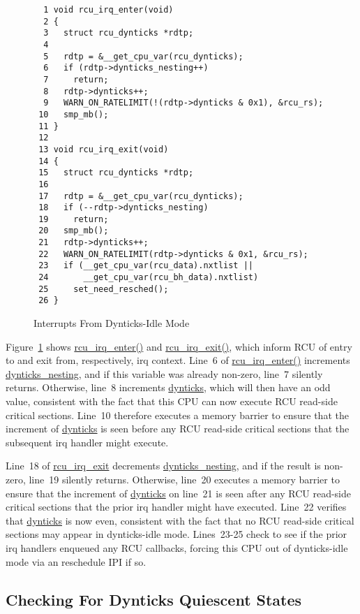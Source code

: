 \begin{figure}[tbp]
{ \scriptsize
\begin{verbatim}
  1 void rcu_irq_enter(void)
  2 {
  3   struct rcu_dynticks *rdtp;
  4 
  5   rdtp = &__get_cpu_var(rcu_dynticks);
  6   if (rdtp->dynticks_nesting++)
  7     return;
  8   rdtp->dynticks++;
  9   WARN_ON_RATELIMIT(!(rdtp->dynticks & 0x1), &rcu_rs);
 10   smp_mb();
 11 }
 12 
 13 void rcu_irq_exit(void)
 14 {
 15   struct rcu_dynticks *rdtp;
 16 
 17   rdtp = &__get_cpu_var(rcu_dynticks);
 18   if (--rdtp->dynticks_nesting)
 19     return;
 20   smp_mb();
 21   rdtp->dynticks++;
 22   WARN_ON_RATELIMIT(rdtp->dynticks & 0x1, &rcu_rs);
 23   if (__get_cpu_var(rcu_data).nxtlist ||
 24       __get_cpu_var(rcu_bh_data).nxtlist)
 25     set_need_resched();
 26 }
\end{verbatim}
}
\caption{Interrupts From Dynticks-Idle Mode}
\label{fig:app:formal:Interrupts From Dynticks-Idle Mode}
\end{figure}

Figure~\ref{fig:app:formal:Interrupts From Dynticks-Idle Mode}
shows \url{rcu_irq_enter()} and \url{rcu_irq_exit()}, which
inform RCU of entry to and exit from, respectively, irq context.
Line~6 of \url{rcu_irq_enter()} increments \url{dynticks_nesting},
and if this variable was already non-zero, line~7 silently returns.
Otherwise, line~8 increments \url{dynticks}, which will then have
an odd value, consistent with the fact that this CPU can now
execute RCU read-side critical sections.
Line~10 therefore executes a memory barrier to ensure that
the increment of \url{dynticks} is seen before any
RCU read-side critical sections that the subsequent irq handler
might execute.

Line~18 of \url{rcu_irq_exit} decrements \url{dynticks_nesting}, and
if the result is non-zero, line~19 silently returns.
Otherwise, line~20 executes a memory barrier to ensure that the
increment of \url{dynticks} on line~21 is seen after any RCU
read-side critical sections that the prior irq handler might have executed.
Line~22 verifies that \url{dynticks} is now even, consistent with
the fact that no RCU read-side critical sections may appear in
dynticks-idle mode.
Lines~23-25 check to see if the prior irq handlers enqueued any
RCU callbacks, forcing this CPU out of dynticks-idle mode via
an reschedule IPI if so.

\subsection{Checking For Dynticks Quiescent States}
\label{app:formal:Checking For Dynticks Quiescent States}

